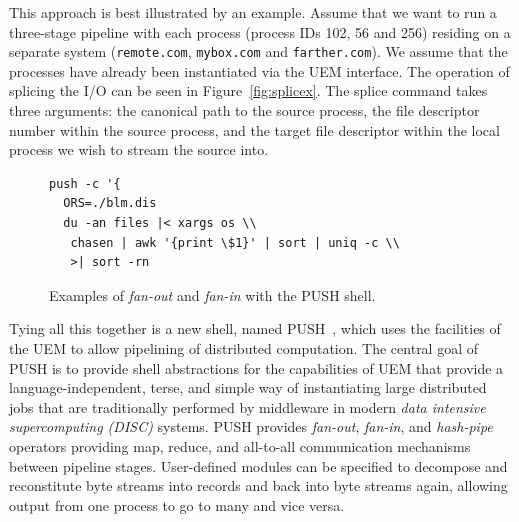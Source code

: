 \documentclass{sig-alternate}
\begin{document}
This approach is best illustrated by an example. Assume that we
want to run a three-stage pipeline with each process (process IDs
102, 56 and 256) residing on a separate system ({\tt remote.com}, {\tt mybox.com}
and {\tt farther.com}). We assume that the processes have already been
instantiated via the UEM interface.  The operation of splicing
the I/O can be seen in Figure~\ref{fig:splicex}.  The splice command
takes three arguments: the canonical path to the source process, the 
file descriptor number within the source process, and the target file
descriptor within the local process we wish to stream the source into. 

\begin{figure}
\begin{center}
\begin{verbatim}
push -c '{
  ORS=./blm.dis
  du -an files |< xargs os \\
   chasen | awk '{print \$1}' | sort | uniq -c \\
   >| sort -rn
\end{verbatim}
\end{center}
\vspace{-0.1in}
\caption{Examples of {\it fan-out} and {\it fan-in} with the PUSH shell.}
\label{fig:push}
\end{figure}

Tying all this together is a new shell, named PUSH~\cite{PODC:Push}, which 
uses the facilities of the UEM to allow pipelining of 
distributed computation.  The central goal of PUSH is to provide shell 
abstractions for the capabilities of UEM that provide a language-independent, 
terse, and simple way of instantiating large distributed jobs 
that are traditionally performed by middleware in modern {\it data intensive 
supercomputing (DISC)} systems. 
PUSH provides {\it fan-out}, {\it fan-in}, and {\it hash-pipe} operators 
providing map, reduce, and all-to-all communication mechanisms between
pipeline stages.
User-defined modules can be specified to 
decompose and reconstitute byte streams into records and back into byte 
streams again, allowing output from one process to go to many and vice 
versa.

\end{document}
